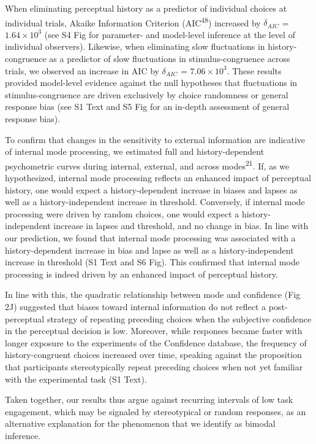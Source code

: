 \documentclass[
]{article}
\begin{document}
When eliminating perceptual history as a predictor of individual choices
at individual trials, Akaike Information Criterion
(AIC\textsuperscript{48}) increased by \(\delta_{AIC}\) =
\(\ensuremath{1.64\times 10^{3}}\) (see S4 Fig for
parameter- and model-level inference at the level of individual
observers). Likewise, when eliminating slow fluctuations in
history-congruence as a predictor of slow fluctuations in
stimulus-congruence across trials, we observed an increase in AIC by
\(\delta_{AIC}\) = \(\ensuremath{7.06\times 10^{3}}\). These results
provided model-level evidence against the null hypotheses that
fluctuations in stimulus-congruence are driven exclusively by choice
randomness or general response bias (see S1 Text and
S5 Fig for an in-depth assessment of general response
bias).

To confirm that changes in the sensitivity to external information are
indicative of internal mode processing, we estimated full and
history-dependent psychometric curves during internal, external, and
across modes\textsuperscript{21}. If, as we hypothesized, internal mode
processing reflects an enhanced impact of perceptual history, one would
expect a history-dependent increase in biases and lapses as well as a
history-independent increase in threshold. Conversely, if internal mode
processing were driven by random choices, one would expect a
history-independent increase in lapses and threshold, and no change in
bias. In line with our prediction, we found that internal mode
processing was associated with a history-dependent increase in bias and
lapse as well as a history-independent increase in threshold
(S1 Text and S6 Fig). This confirmed
that internal mode processing is indeed driven by an enhanced impact of
perceptual history.

In line with this, the quadratic relationship between mode and
confidence (Fig 2J) suggested that biases toward internal information
do not reflect a post-perceptual strategy of repeating preceding choices
when the subjective confidence in the perceptual decision is low.
Moreover, while responses became faster with longer exposure to the
experiments of the Confidence database, the frequency of
history-congruent choices increased over time, speaking against the
proposition that participants stereotypically repeat preceding choices
when not yet familiar with the experimental task (S1 Text).

Taken together, our results thus argue against recurring intervals of
low task engagement, which may be signaled by stereotypical or random
responses, as an alternative explanation for the phenomenon that we
identify as bimodal inference.
\end{document}
